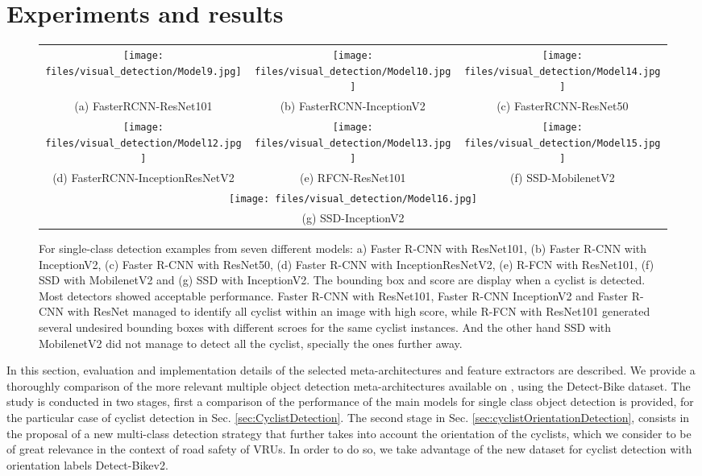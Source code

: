 \documentclass[journal]{IEEEtran}
\begin{document}
\section{Experiments and results}
\label{sec:exp}
\begin{figure*}[ht!]
\begin{center}
\begin{tabular}{c c c}
\texttt{[image: files/visual\_detection/Model9.jpg]} & \texttt{[image: files/visual\_detection/Model10.jpg]} & \texttt{[image: files/visual\_detection/Model14.jpg]} \\
(a) FasterRCNN-ResNet101 & (b) FasterRCNN-InceptionV2 & (c) FasterRCNN-ResNet50 \\[6pt]
  \texttt{[image: files/visual\_detection/Model12.jpg]} &  \texttt{[image: files/visual\_detection/Model13.jpg]} & \texttt{[image: files/visual\_detection/Model15.jpg]} \\
 (d) FasterRCNN-InceptionResNetV2 &
(e) RFCN-ResNet101 & (f) SSD-MobilenetV2 \\[6pt]
\multicolumn{3}{c}{\texttt{[image: files/visual\_detection/Model16.jpg]} }\\
\multicolumn{3}{c}{(g) SSD-InceptionV2}
\end{tabular}
\caption{For single-class detection examples from seven different models: a) Faster R-CNN with ResNet101, (b) Faster R-CNN with InceptionV2, (c) Faster R-CNN with ResNet50, (d) Faster R-CNN with InceptionResNetV2, (e) R-FCN with ResNet101, (f) SSD with MobilenetV2 and (g) SSD with InceptionV2. The bounding box and score are display when a cyclist is detected. Most detectors showed acceptable performance. Faster R-CNN with ResNet101, Faster R-CNN InceptionV2 and Faster R-CNN with ResNet managed to identify all cyclist within an image with high score, while R-FCN with ResNet101 generated several undesired bounding boxes with different scroes for the same cyclist instances. And the other hand SSD with MobilenetV2 did not manage to detect all the cyclist, specially the ones further away.}
\label{fig:visualCyclist}
\end{center}
\end{figure*}

In this section, evaluation and implementation details of the selected meta-architectures and feature extractors are described. We provide a thoroughly comparison of the more relevant multiple object detection meta-architectures available on \cite{TensorFlow2019}, using the Detect-Bike dataset. The study is conducted in two stages, first a comparison of the performance of the main models for single class object detection is provided, for the particular case of cyclist detection in Sec. \ref{sec:CyclistDetection}. The second stage in Sec. \ref{sec:cyclistOrientationDetection}, consists in the proposal of a new multi-class detection strategy that further takes into account the orientation of the cyclists, which we consider to be of great relevance in the context of road safety of VRUs. In order to do so, we take advantage of the new dataset for cyclist detection with orientation labels Detect-Bikev2.
\end{document}
